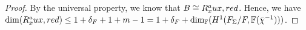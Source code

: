 \documentclass[12pt]{amsart}
\theoremstyle{plain}
\theoremstyle{definition}
\newtheorem{prop}[thm]{Proposition}
\theoremstyle{remark}
\begin{document}
\begin{proof}
 	 By the universal property, we know that $B \cong R_x^\textnormal{aux,red}$. Hence, we have $\operatorname{dim} (R_x^\textnormal{aux,red}) \le 1+\delta_F +1+m-1 =1+\delta_F +\operatorname{dim}_{\mathbb{F}}(H^1(F_{\Sigma}/F, \mathbb{F}(\bar{\chi}^{-1})))$.
 	 
 	 
 	 
 \end{proof}
 
 
\end{document}
